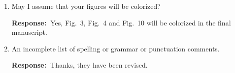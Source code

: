 \documentclass[a4paper, 11pt]{article}
\def\Response{\noindent \textbf{Response:~}}
\newcommand{\Question}[1]{\textcolor[rgb]{0.51,0.00,0.00}{#1}}
\begin{document}
\begin{enumerate}
      \Response Actually no specific constraints are applied, except the global clock constraint.
      
  \item \Question{May I assume that your figures will be colorized?}
        
      \Response Yes, Fig.~3, Fig.~4 and Fig.~10 will be colorized in the final manuscript.
      
  \item \Question{An incomplete list of spelling or grammar or punctuation comments.}
      
      \Response Thanks, they have been revised.

      

\end{enumerate}
\end{document}
